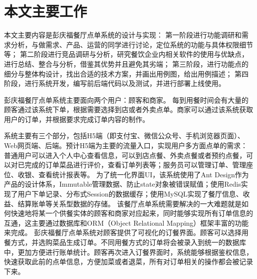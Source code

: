 






\section{本文主要工作}
本文主要内容是彭庆福餐厅点单系统的设计与实现：
第一阶段进行功能调研和需求分析，与做需求、产品、运营的同学进行讨论，定位系统的功能与具体权限细节等；
第二阶段进行竞品调研与分析，研究餐饮企业内相关软件的使用与优缺点，进行总结、整合与分析，借鉴其优势并且避免其劣端；
第三阶段，进行功能点的细分与整体构设计，找出合适的技术方案，并画出用例图，给出用例描述；
第四阶段，进行系统开发，编写前后端代码以及测试，并进行部署上线使用。 

彭庆福餐厅点单系统主要面向两个用户：顾客和商家。
每到用餐时间会有大量的顾客通过该系统下单，根据需要选择到店或者外卖点单。商家可以通过该系统获取用户的订单，并根据要求完成订单内容的制作。 

系统主要有三个部分，包括H5端（即支付宝、微信公众号、手机浏览器页面）、Web网页端、后端。预计H5端为主要的流量入口，实现用户多方面点单的需求：普通用户可以进入个人中心查看信息，可以到店点餐、外卖点餐或者预约点餐，可以对已完成的订单菜品进行评价，查看订单列表等；服务员可以管理订单、管理座位、收银、查看统计报表等。
为了统一化界面UI，该系统使用了Ant Design作为产品的设计体系，Immutable管理数据、防止state对象被错误赋值；使用Redis实现了用户下单记录、分布式Session的数据缓存；使用MySQL实现了餐厅信息、收益、结算账单等关系型数据的存储。
该餐厅点单系统需要解决的一大难题就是如何快速地将某一个供餐实体的顾客和商家对应起来，同时能够实现所有订单信息的互通，这主要通过数据库和ORM（Object Relational Mapping）框架丰富的功能来完成。
彭庆福餐厅点单系统对顾客提供了可视化的订餐界面。顾客可以选择用餐方式，并选购菜品生成订单。不同用餐方式的订单将会被录入到统一的数据库中，更加方便进行账单统计。顾客再次进入订餐界面时，系统能够根据鉴权信息，快速获取此前的点单信息，方便加菜或者退菜，所有对订单相关的操作都会被记录下来。 

